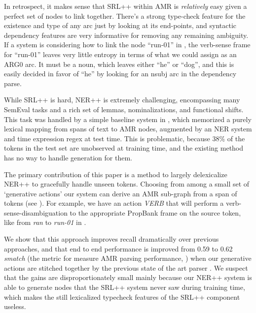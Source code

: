 \documentclass[11pt]{article}
\newcommand\w[1]{\textit{#1}} %
\newcommand\n[1]{\textit{#1}} %
\begin{document}
In retrospect, it makes sense that SRL++ within AMR is \textit{relatively} easy given a perfect set of nodes to link together.
There's a strong type-check feature for the existence and type of any arc just by looking at its end-points, and syntactic dependency features are very informative for removing any remaining ambiguity.
If a system is considering how to link the node ``run-01'' in , the verb-sense frame for ``run-01'' leaves very little entropy in terms of what we could assign as an ARG0 arc.
It must be a noun, which leaves either ``he'' or ``dog'', and this is easily decided in favor of ``he'' by looking for an nsubj arc in the dependency parse. 

While SRL++ is hard, NER++ is extremely challenging, encompassing many SemEval tasks and a rich set of lemmas, nominalizations, and functional shifts.
This task was handled by a simple baseline system in \cite{2014flanigan-amr}, which memorized a purely lexical mapping from spans of text to AMR nodes, augmented by an NER system and time expression regex at test time.
This is problematic, because 38\% of the tokens in the test set are unobserved at training time, and the existing method has no way to handle generation for them.

The primary contribution of this paper is a method to largely delexicalize NER++ to gracefully handle unseen tokens.
Choosing from among a small set of `generative actions' our system can derive an AMR sub-graph from a span of tokens (see ).
For example, we have an action \textit{VERB} that will perform a verb-sense-disambiguation to the appropriate PropBank frame \cite{palmer2005proposition-srl} on the source token, like from \w{ran} to \n{run-01} in .

We show that this approach improves recall dramatically over previous approaches, and that end to end performance is improved from 0.59 to 0.62 \n{smatch} (the metric for measure AMR parsing performance, \cite{cai2013smatch-amr}) when our generative actions are stitched together by the previous state of the art parser \cite{2014flanigan-amr}.
We suspect that the gains are disproportionately small mainly because our NER++ system is able to generate nodes that the SRL++ system never saw during training time, which makes the still lexicalized typecheck features of the SRL++ component useless.

\end{document}
